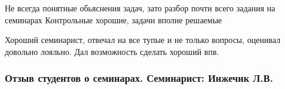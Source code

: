                 \begin{commentbox} 
                    Не всегда понятные обьяснения задач, зато разбор почти всего задания на семинарах
                    Контрольные хорошие, задачи вполне решаемые  
                \end{commentbox} 
            
                \begin{commentbox} 
                    Хороший семинарист, отвечал на все тупые и не только вопросы, оценивал довольно лояльно. Дал возможность сделать хороший впв. 
                \end{commentbox} 



        \subsubsection{Отзыв студентов о семинарах. Семинарист: Инжечик Л.В.}
